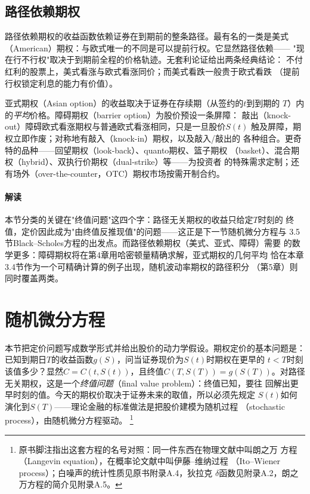 \subsection{路径依赖期权}

路径依赖期权的收益函数依赖证券在到期前的整条路径。最有名的一类是美式
（American）期权：与欧式唯一的不同是可以提前行权。它显然路径依赖——
"现在行不行权"取决于到期前全程的价格轨迹。无套利论证给出两条经典结论：
不付红利的股票上，美式看涨与欧式看涨同价；而美式看跌一般贵于欧式看跌
（提前行权锁定利息的能力有价值）。

亚式期权（Asian option）的收益取决于证券在存续期（从签约的$t$到到期的
$T$）内的\emph{平均}价格。障碍期权（barrier option）为股价预设一条屏障：
敲出（knock-out）障碍欧式看涨期权与普通欧式看涨相同，只是一旦股价$S(t)$
触及屏障，期权立即作废；对称地有敲入（knock-in）期权，以及敲入/敲出的
各种组合。更奇特的品种——回望期权（look-back）、quanto期权、篮子期权
（basket）、混合期权（hybrid）、双执行价期权（dual-strike）等——为投资者
的特殊需求定制；还有场外（over-the-counter，OTC）期权市场按需开制合约。

\paragraph{解读}
本节分类的关键在"终值问题"这四个字：路径无关期权的收益只给定$T$时刻的
终值，定价因此成为"由终值反推现值"的问题——这正是下一节随机微分方程与
3.5节Black--Scholes方程的出发点。而路径依赖期权（美式、亚式、障碍）需要
的数学更多：障碍期权将在第4章用哈密顿量精确求解，亚式期权的几何平均
恰在本章3.4节作为一个可精确计算的例子出现，随机波动率期权的路径积分
（第5章）则同时覆盖两类。

\section{随机微分方程}

本节把定价问题写成数学形式并给出股价的动力学假设。期权定价的基本问题是：
已知到期日$T$的收益函数$g(S)$，问当证券现价为$S(t)$时期权在更早的
$t<T$时刻该值多少？显然$C=C(t,S(t))$，且终值$C(T,S(T))=g(S(T))$。对路径
无关期权，这是一个\emph{终值问题}（final value problem）：终值已知，要往
回解出更早时刻的值。今天的期权价取决于证券未来的取值，所以必须先规定
$S(t)$如何演化到$S(T)$——理论金融的标准做法是把股价建模为随机过程
（stochastic process），由随机微分方程驱动。
\footnote{原书脚注指出这套方程的名号对照：同一件东西在物理文献中叫朗之万
方程（Langevin equation），在概率论文献中叫伊藤--维纳过程
（Ito--Wiener process）；白噪声的统计性质见原书附录A.4，狄拉克
$\delta$函数见附录A.2，朗之万方程的简介见附录A.5。}

